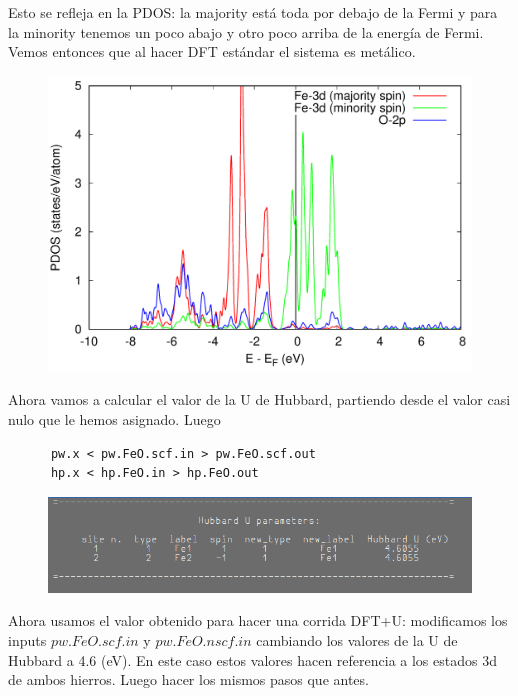   Esto se refleja en la PDOS: la majority está toda por debajo de la Fermi y para la minority tenemos un poco abajo y otro poco arriba de la energía de Fermi. Vemos entonces que al hacer DFT estándar el sistema es metálico.

  \begin{figure}[H]
      \centering
      \includegraphics[scale = 0.25]{figs/D4/FeO_pre.png}
  \end{figure}

  Ahora vamos a calcular el valor de la U de Hubbard, partiendo desde el valor casi nulo que le hemos asignado. Luego
    \begin{verbatim}
      pw.x < pw.FeO.scf.in > pw.FeO.scf.out
      hp.x < hp.FeO.in > hp.FeO.out
    \end{verbatim}

    \begin{figure}[H]
        \centering
        \includegraphics[scale = 0.5]{figs/D4/U.png}
    \end{figure}

  Ahora usamos el valor obtenido para hacer una corrida DFT+U: modificamos los inputs $pw.FeO.scf.in$ y $pw.FeO.nscf.in$ cambiando los valores de la U de Hubbard a 4.6 (eV). En este caso estos valores hacen referencia a los estados 3d de ambos hierros. Luego hacer los mismos pasos que antes.

